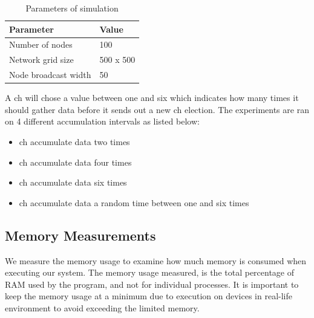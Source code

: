 \documentclass[USenglish]{uit-thesis}
\begin{document}
\begin{table} [ht]
\centering
\begin{tabular}{|l|l|}
\hline
\textbf{Parameter}       & \textbf{Value} \\ \hline
Number of nodes          & 100            \\ \hline
Network grid size        & 500 x 500      \\ \hline
Node broadcast width     & 50             \\ \hline
\end{tabular}
\caption{Parameters of simulation}
\label{tab:simTable}
\end{table}


A \gls{ch} will chose a value between one and six which indicates how many times it should gather data before it sends out a new \gls{ch} election. The experiments are ran on 4 different accumulation intervals as listed below:

\begin{itemize}
\item \gls{ch} accumulate data two times
\item \gls{ch} accumulate data four times
\item \gls{ch} accumulate data six times
\item \gls{ch} accumulate data a random time between one and six times
\end{itemize}



\subsection{Memory Measurements} \label{eva:mem_measure}
We measure the memory usage to examine how much memory is consumed when executing our system. The memory usage measured, is the total percentage of RAM used by the program, and not for individual processes. It is important to keep the memory usage at a minimum due to execution on devices in real-life environment to avoid exceeding the limited memory.
\end{document}
